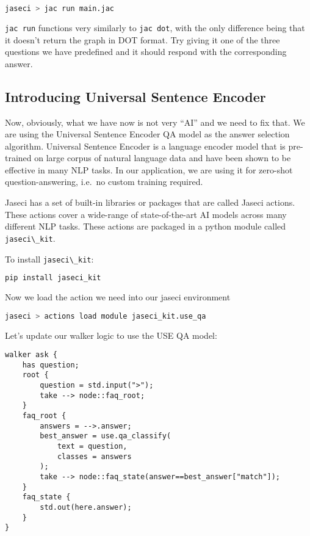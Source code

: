 \begin{lstlisting}[language=bash]
jaseci > jac run main.jac
\end{lstlisting}

\passthrough{\lstinline!jac run!} functions very similarly to
\passthrough{\lstinline!jac dot!}, with the only difference being that
it doesn't return the graph in DOT format. Try giving it one of the
three questions we have predefined and it should respond with the
corresponding answer.

\hypertarget{introducing-universal-sentence-encoder}{%
\subsection{Introducing Universal Sentence
Encoder}\label{introducing-universal-sentence-encoder}}

Now, obviously, what we have now is not very ``AI'' and we need to fix
that. We are using the Universal Sentence Encoder QA model as the answer
selection algorithm. Universal Sentence Encoder is a language encoder
model that is pre-trained on large corpus of natural language data and
have been shown to be effective in many NLP tasks. In our application,
we are using it for zero-shot question-answering, i.e.~no custom
training required.

Jaseci has a set of built-in libraries or packages that are called
Jaseci actions. These actions cover a wide-range of state-of-the-art AI
models across many different NLP tasks. These actions are packaged in a
python module called \passthrough{\lstinline!jaseci\_kit!}.

To install \passthrough{\lstinline!jaseci\_kit!}:

\begin{lstlisting}[language=bash]
pip install jaseci_kit
\end{lstlisting}

Now we load the action we need into our jaseci environment

\begin{lstlisting}[language=bash]
jaseci > actions load module jaseci_kit.use_qa
\end{lstlisting}

Let's update our walker logic to use the USE QA model:

\begin{lstlisting}
walker ask {
    has question;
    root {
        question = std.input(">");
        take --> node::faq_root;
    }
    faq_root {
        answers = -->.answer;
        best_answer = use.qa_classify(
            text = question,
            classes = answers
        );
        take --> node::faq_state(answer==best_answer["match"]);
    }
    faq_state {
        std.out(here.answer);
    }
}
\end{lstlisting}


